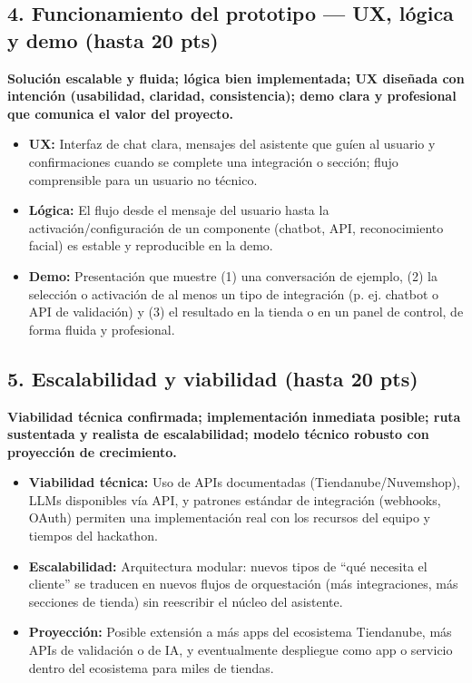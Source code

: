 \documentclass[9pt,a4paper,twocolumn,twoside]{rho-class/rho}
\begin{document}
\subsection{4. Funcionamiento del prototipo — UX, lógica y demo (hasta 20 pts)}

\textbf{Solución escalable y fluida; lógica bien implementada; UX diseñada con intención (usabilidad, claridad, consistencia); demo clara y profesional que comunica el valor del proyecto.}

\begin{itemize}
    \item \textbf{UX:} Interfaz de chat clara, mensajes del asistente que guíen al usuario y confirmaciones cuando se complete una integración o sección; flujo comprensible para un usuario no técnico.
    \item \textbf{Lógica:} El flujo desde el mensaje del usuario hasta la activación/configuración de un componente (chatbot, API, reconocimiento facial) es estable y reproducible en la demo.
    \item \textbf{Demo:} Presentación que muestre (1) una conversación de ejemplo, (2) la selección o activación de al menos un tipo de integración (p. ej. chatbot o API de validación) y (3) el resultado en la tienda o en un panel de control, de forma fluida y profesional.
\end{itemize}

\subsection{5. Escalabilidad y viabilidad (hasta 20 pts)}

\textbf{Viabilidad técnica confirmada; implementación inmediata posible; ruta sustentada y realista de escalabilidad; modelo técnico robusto con proyección de crecimiento.}

\begin{itemize}
    \item \textbf{Viabilidad técnica:} Uso de APIs documentadas (Tiendanube/Nuvemshop), LLMs disponibles vía API, y patrones estándar de integración (webhooks, OAuth) permiten una implementación real con los recursos del equipo y tiempos del hackathon.
    \item \textbf{Escalabilidad:} Arquitectura modular: nuevos tipos de ``qué necesita el cliente'' se traducen en nuevos flujos de orquestación (más integraciones, más secciones de tienda) sin reescribir el núcleo del asistente.
    \item \textbf{Proyección:} Posible extensión a más apps del ecosistema Tiendanube, más APIs de validación o de IA, y eventualmente despliegue como app o servicio dentro del ecosistema para miles de tiendas.
\end{itemize}
\end{document}
